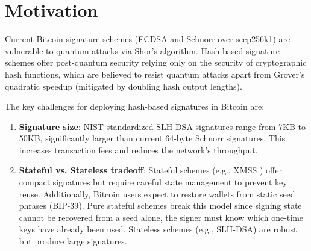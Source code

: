 \section{Motivation}
Current Bitcoin signature schemes (ECDSA\cite{ecdsa_fips186}  and Schnorr\cite{bip340} over secp256k1) are vulnerable to quantum attacks via Shor's algorithm\cite{shor1994algorithms, shor1997polynomial}. Hash-based signature schemes offer post-quantum security relying only on the security of cryptographic hash functions, which are believed to resist quantum attacks apart from Grover's quadratic speedup (mitigated by doubling hash output lengths).

The key challenges for deploying hash-based signatures in Bitcoin are:
\begin{enumerate}
    \item \textbf{Signature size}: NIST-standardized SLH-DSA signatures \cite{slhdsa_fips205} range from 7KB to 50KB, significantly larger than current 64-byte Schnorr signatures. This increases transaction fees and reduces the network's throughput.
    \item \textbf{Stateful vs. Stateless tradeoff}: Stateful schemes (e.g., XMSS \cite{nist_sp800_208}) offer compact signatures but require careful state management to prevent key reuse. Additionally, Bitcoin users expect to restore wallets from static seed phrases (BIP-39\cite{bip39}). Pure stateful schemes break this model since signing state cannot be recovered from a seed alone, the signer must know which one-time keys have already been used. Stateless schemes (e.g., SLH-DSA) are robust but produce large signatures. 
\end{enumerate}

